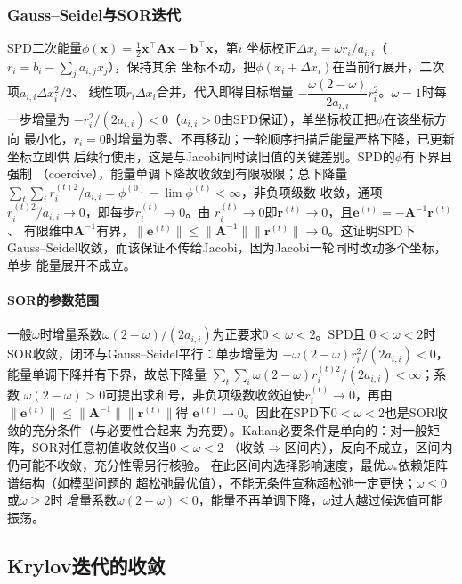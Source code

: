 \subsubsection{Gauss--Seidel与SOR迭代}

SPD二次能量$\phi(\bm x)=\tfrac12\bm x^{\top}\bm A\bm x-\bm b^{\top}\bm x$，第$i$
坐标校正$\Delta x_i=\omega r_i/a_{i,i}$（$r_i=b_i-\sum_ja_{i,j}x_j$），保持其余
坐标不动，把$\phi(x_i+\Delta x_i)$在当前行展开，二次项$a_{i,i}\Delta x_i^2/2$、
线性项$r_i\Delta x_i$合并，代入即得目标增量
$-\dfrac{\omega(2-\omega)}{2a_{i,i}}r_i^2$。$\omega=1$时每一步增量为
$-r_i^2/(2a_{i,i})<0$（$a_{i,i}>0$由SPD保证），单坐标校正把$\phi$在该坐标方向
最小化，$r_i=0$时增量为零、不再移动；一轮顺序扫描后能量严格下降，已更新坐标立即供
后续行使用，这是与Jacobi同时读旧值的关键差别。SPD的$\phi$有下界且强制
（coercive），能量单调下降故收敛到有限极限；总下降量
$\sum_t\sum_i r_i^{(t)2}/a_{i,i}=\phi^{(0)}-\lim\phi^{(t)}<\infty$，非负项级数
收敛，通项$r_i^{(t)2}/a_{i,i}\to0$，即每步$r_i^{(t)}\to0$。由
$r_i^{(t)}\to0$即$\bm r^{(t)}\to0$，且$\bm e^{(t)}=-\bm A^{-1}\bm r^{(t)}$、
有限维中$\bm A^{-1}$有界，$\lVert\bm e^{(t)}\rVert
\leq\lVert\bm A^{-1}\rVert\lVert\bm r^{(t)}\rVert\to0$。这证明SPD下
Gauss--Seidel收敛，而该保证不传给Jacobi，因为Jacobi一轮同时改动多个坐标，单步
能量展开不成立。

\paragraph{SOR的参数范围}

一般$\omega$时增量系数$\omega(2-\omega)/(2a_{i,i})$为正要求$0<\omega<2$。SPD且
$0<\omega<2$时SOR收敛，闭环与Gauss--Seidel平行：单步增量为
$-\omega(2-\omega)r_i^2/(2a_{i,i})<0$，能量单调下降并有下界，故总下降量
$\sum_t\sum_i\omega(2-\omega)r_i^{(t)2}/(2a_{i,i})<\infty$；系数
$\omega(2-\omega)>0$可提出求和号，非负项级数收敛迫使$r_i^{(t)}\to0$，再由
$\lVert\bm e^{(t)}\rVert\leq\lVert\bm A^{-1}\rVert\lVert\bm r^{(t)}\rVert$得
$\bm e^{(t)}\to0$。因此在SPD下$0<\omega<2$也是SOR收敛的充分条件（与必要性合起来
为充要）。Kahan必要条件是单向的：对一般矩阵，SOR对任意初值收敛仅当$0<\omega<2$
（收敛$\Rightarrow$区间内），反向不成立，区间内仍可能不收敛，充分性需另行核验。
在此区间内选择影响速度，最优$\omega_*$依赖矩阵谱结构（如模型问题的
超松弛最优值），不能无条件宣称超松弛一定更快；$\omega\leq0$或$\omega\geq2$时
增量系数$\omega(2-\omega)\leq0$，能量不再单调下降，$\omega$过大越过候选值可能
振荡。

\subsection{Krylov迭代的收敛}
\label{sec:ls-krylov-convergence}

